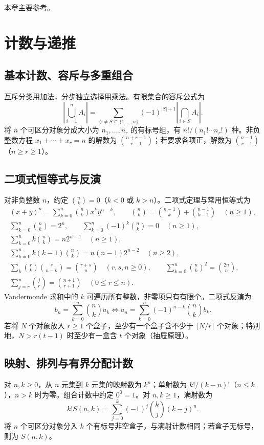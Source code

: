 \documentclass[../main.tex]{subfiles}
\begin{document}
本章主要参考\cite{cameron,mcs}。

\section{计数与递推}
\subsection{基本计数、容斥与多重组合}
互斥分类用加法，分步独立选择用乘法。有限集合的容斥公式为
\[
\left|\bigcup_{i=1}^nA_i\right|=\sum_{\varnothing\ne S\subseteq\{1,\ldots,n\}}
(-1)^{|S|+1}\left|\bigcap_{i\in S}A_i\right|.
\]
将 $n$ 个可区分对象分成大小为 $n_1,\ldots,n_r$ 的有标号组，有 $n!/(n_1!\cdots n_r!)$ 种。非负整数方程 $x_1+\cdots+x_r=n$ 的解数为 $\binom{n+r-1}{r-1}$；若要求各项正，解数为 $\binom{n-1}{r-1}$（$n\ge r\ge1$）。
\subsection{二项式恒等式与反演}
对非负整数 $n$，约定 $\binom nk=0$（$k<0$ 或 $k>n$）。二项式定理与常用恒等式为
\begin{gather*}
(x+y)^n=\sum_{k=0}^n\binom nk x^ky^{n-k},\qquad
\binom nk=\binom{n-1}k+\binom{n-1}{k-1}\quad(n\ge1),\\
\sum_{k=0}^n\binom nk=2^n,\qquad
\sum_{k=0}^n(-1)^k\binom nk=0\quad(n\ge1),\\
\sum_{k=0}^n k\binom nk=n2^{n-1}\quad(n\ge1),\\
\sum_{k=0}^n k(k-1)\binom nk=n(n-1)2^{n-2}\quad(n\ge2),\\
\sum_k\binom rk\binom s{n-k}=\binom{r+s}n\quad(r,s,n\ge0),\qquad
\sum_{k=0}^n\binom nk^2=\binom{2n}n,\\
\sum_{j=r}^n\binom jr=\binom{n+1}{r+1}\quad(0\le r\le n).
\end{gather*}
Vandermonde 求和中的 $k$ 可遍历所有整数，非零项只有有限个。二项式反演为
\[
b_n=\sum_{k=0}^n\binom nk a_k
\iff a_n=\sum_{k=0}^n(-1)^{n-k}\binom nk b_k.
\]
若将 $N$ 个对象放入 $r\ge1$ 个盒子，至少有一个盒子含不少于 $\lceil N/r\rceil$ 个对象；特别地，$N>r(t-1)$ 时至少有一盒含 $t$ 个对象（抽屉原理）。

\subsection{映射、排列与有界分配计数}
对 $n,k\ge0$，从 $n$ 元集到 $k$ 元集的映射数为 $k^n$；单射数为 $k!/(k-n)!$（$n\le k$），$n>k$ 时为零。组合计数中约定 $0^0=1$。对 $n,k\ge1$，满射数为
\[
k!S(n,k)=\sum_{j=0}^k(-1)^j\binom kj(k-j)^n.
\]
将 $n$ 个可区分对象分入 $k$ 个有标号非空盒子，与满射计数相同；若盒子无标号，则为 $S(n,k)$。
\end{document}
